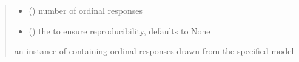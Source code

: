 \documentclass[letterpaper,10pt,english]{sphinxmanual}
\begin{document}
\begin{fulllineitems}
\begin{quote}
\begin{description}
\begin{itemize}
\item {} 
\sphinxAtStartPar
{} () \textendash{} number of ordinal responses

\item {} 
\sphinxAtStartPar
{} (\sphinxstyleliteralemphasis{\sphinxupquote{, }}) \textendash{} the  to ensure reproducibility, defaults to None

\end{itemize}

\sphinxAtStartPar
an instance of  containing ordinal responses drawn from the specified model

\end{description}\end{quote}

\end{fulllineitems}

\end{document}
